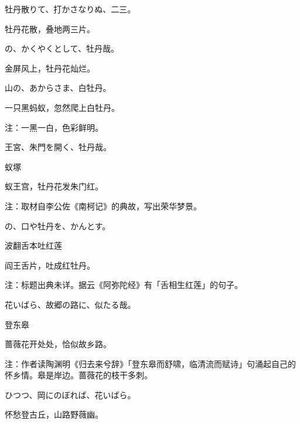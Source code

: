 \begin{haiku}
    {\FH 牡丹散りて、打かさなりぬ、二三。}

    {\FK 牡丹花散，叠地两三片。}
\end{haiku}

\begin{haiku}
    {\FH {}の、かくやくとして、牡丹哉。}

    {\FK 金屏风上，牡丹花灿烂。}
\end{haiku}

\begin{haiku}
    {\FH 山の、あからさま、白牡丹。}

    {\FK 一只黑蚂蚁，忽然爬上白牡丹。}

    {\FT 注：一黑一白，色彩鲜明。}
\end{haiku}

\begin{haiku}
    {\FH {}王宮、朱門を開く、牡丹哉。}

    {\FK 蚁塚}

    {\FK 蚁王宫，牡丹花发朱门红。}

    {\FT 注：取材自李公佐《南柯记》的典故，写出荣华梦景。}
\end{haiku}

\begin{haiku}
    {\FH {}の、口や牡丹を、かんとす。}

    {\FK 波翻舌本吐红莲}

    {\FK 阎王舌片，吐成红牡丹。}

    {\FT 注：标题出典未详。据云《阿弥陀经》有「舌相生红莲」的句子。}
\end{haiku}

\begin{haiku}
    {\FH 花いばら、故郷の路に、似たる哉。}

    {\FK 登东皋}

    {\FK 蔷薇花开处处，恰似故乡路。}

    {\FT 注：作者读陶渊明《归去来兮辞》「登东皋而舒啸，临清流而赋诗」句涌起自己的怀乡情。皋是岸边。蔷薇花的枝干多刺。}
\end{haiku}

\begin{haiku}
    {\FH {}ひつつ、岡にのぼれば、花いばら。}

    {\FK 怀愁登古丘，山路野薇幽。}
\end{haiku}

